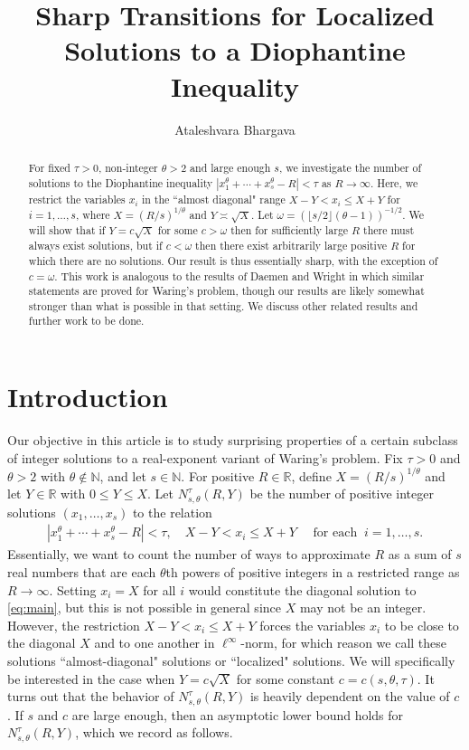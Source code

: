 \documentclass[11pt,reqno]{amsart}
\title{Sharp Transitions for Localized Solutions to a Diophantine Inequality }
\author{Ataleshvara Bhargava}
\numberwithin{equation}{section}
\begin{document}
\begin{abstract} For fixed $\tau > 0$, non-integer $\theta > 2$ and large enough $s$, we investigate the number of solutions to the Diophantine inequality $|x_1^{\theta}+\cdots +x_s^{\theta} - R| < \tau$ as $R \to \infty$. Here, we restrict the variables $x_i$ in the ``almost diagonal" range $X-Y < x_i \leq X+Y$ for $i = 1, \ldots, s$, where $X = (R/s)^{1/\theta}$ and $Y \asymp \sqrt{X}$. Let $\omega = (\lfloor s/2 \rfloor(\theta-1))^{-1/2}$. We will show that if $Y = c\sqrt{X}$ for some $c > \omega$ then for sufficiently large $R$ there must always exist solutions, but if $c < \omega$ then there exist arbitrarily large positive $R$ for which there are no solutions. Our result is thus essentially sharp, with the exception of $c = \omega$. This work is analogous to the results of Daemen \cite{DaemenAA1} and Wright \cite{Wright1} in which similar statements are proved for Waring's problem, though our results are likely somewhat stronger than what is possible in that setting. We discuss other related results and further work to be done. 

\end{abstract}

\maketitle 

\everymath{\displaystyle} 


\section{Introduction} 
Our objective in this article is to study surprising properties of a certain subclass of integer solutions to a real-exponent variant of Waring's problem. Fix $\tau > 0$ and $\theta > 2$ with $\theta \notin \mathbb{N}$, and let $s \in \mathbb{N}$.  
For positive $R \in \mathbb{R}$, define $X = (R/s)^{1/\theta}$ and let $Y \in \mathbb{R}$ with $0 \leq Y \leq X$. Let $N_{s,\theta}^{\tau}(R,Y)$ be the number of positive integer solutions $(x_1, \ldots, x_s)$ to the relation 
\begin{align} \label{eq:main}
|x_1^{\theta} + \cdots +x_s^{\theta} - R| < \tau, \quad X-Y < x_i \leq X+Y \quad \text{ for each } \ i = 1, \ldots, s.
\end{align}
Essentially, we want to count the number of ways to approximate $R$ as a sum of $s$ real numbers that are each $\theta$th powers of positive integers in a restricted range as $R \to \infty$. Setting $x_i = X$ for all $i$ would constitute the diagonal solution to \eqref{eq:main}, but this is not possible in general since $X$ may not be an integer. However, the restriction $X-Y < x_i \leq X+Y$ forces the variables $x_i$ to be close to the diagonal $X$ and to one another in $\ell^{\infty}$-norm, for which reason we call these solutions ``almost-diagonal" solutions or ``localized" solutions. We will specifically be interested in the case when $Y = c\sqrt{X}$ for some constant $c = c(s,\theta,\tau)$. It turns out that the behavior of $N_{s,\theta}^{\tau}(R, Y)$ is heavily dependent on the value of $c$. If $s$ and $c$ are large enough, then an asymptotic lower bound holds for $N_{s,\theta}^{\tau}(R, Y)$, which we record as follows. 
\end{document}
